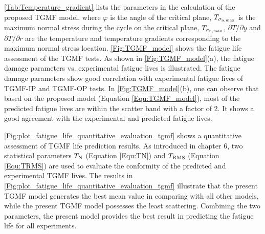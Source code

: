 \documentclass[preprint,5p,twocolumn,11pt,sort&compress]{elsarticle}
\begin{document}
\autoref{Tab:Temperature_gradient} lists the parameters in the calculation of the proposed TGMF model, where $\varphi$ is the angle of the critical plane, $T_{\sigma_{\rm n,\max}}$ is the maximum normal stress during the cycle on the critical plane, $T_{\sigma_{\rm n,\max}}$, $\partial T/\partial y$ and $\partial T/\partial r$ are the temperature and temperature gradients corresponding to the maximum normal stress location.
\autoref{Fig:TGMF_model} shows the fatigue life assessment of the TGMF tests. As shown in \autoref{Fig:TGMF_model}(a), the fatigue damage parameters vs. experimental fatigue lives is illustrated. The fatigue damage parameters show good correlation with experimental fatigue lives of TGMF-IP and TGMF-OP tests. In \autoref{Fig:TGMF_model}(b), one can observe that based on the proposed model (Equation \eqref{Equ:TGMF_model}), most of the predicted fatigue lives are within the scatter band with a factor of 2. It shows a good agreement with the experimental and predicted fatigue lives.

\autoref{Fig:plot_fatigue_life_quantitative_evaluation_tgmf} shows a quantitative assessment of TGMF life prediction results. As introduced in chapter 6, two statistical parameters ${T_{\rm N}}$ (Equation \eqref{Equ:TN}) and ${T_{\rm RMS}}$ (Equation \eqref{Equ:TRMS}) are used to evaluate the conformity of the predicted and experimental TGMF lives. The results in \autoref{Fig:plot_fatigue_life_quantitative_evaluation_tgmf} illustrate that the present TGMF model generates the best mean value in comparing with all other models, while the present TGMF model possesses the least scattering. Combining the two parameters, the present model provides the best result in predicting the fatigue life for all experiments.
\end{document}
